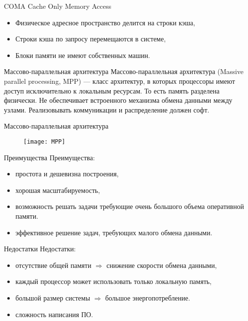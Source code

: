 \begin{frame}{COMA}
\vfill
Cache Only Memory Access
\vfill
\begin{itemize}
    \item Физическое адресное пространство делится на строки кэша,
    \item Строки кэша по запросу перемещаются в системе,
    \item Блоки памяти не имеют собственных машин.
\end{itemize}
\end{frame}

\begin{frame}{Массово-параллельная архитектура}
Массово-параллельная архитектура (\abbr Massive parallel processing, MPP) --- класс архитектур, в которых процессоры имеют доступ исключительно к локальным ресурсам. То есть память разделена физически.
\vfill
Не обеспечивает встроенного механизма обмена данными между узлами. Реализовывать коммуникации и распределение должен софт.
\end{frame}

\begin{frame}{Массово-параллельная архитектура}
\begin{figure}[htpb]
    \centering
    \texttt{[image: MPP]}
\end{figure}
\end{frame}

\begin{frame}{Преимущества}
Преимущества:
\begin{itemize}
    \item простота и дешевизна построения,
    \item хорошая масштабируемость,
    \item возможность решать задачи требующие очень большого объема оперативной
    памяти.
    \item эффективное решение задач, требующих малого обмена данными.
\end{itemize}
\end{frame}

\begin{frame}{Недостатки}
Недостатки:
\begin{itemize}
    \item отсутствие общей памяти $\Rightarrow$ снижение скорости обмена данными,
    \item каждый процессор может использовать только локальную память,
    \item большой размер системы $\Rightarrow$ большое энергопотребление.
    \item сложность написания ПО.
\end{itemize}
\end{frame}

